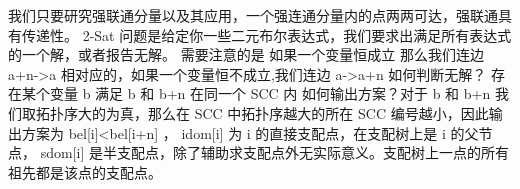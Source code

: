 {}\markdownRendererInterblockSeparator
{}
\markdownRendererSectionEnd 
\markdownRendererSectionEnd \markdownRendererSectionBegin
{}\markdownRendererInterblockSeparator
{}\markdownRendererSectionBegin
{}\markdownRendererInterblockSeparator
{}我们只要研究强联通分量以及其应用，一个强连通分量内的点两两可达，强联通具有传递性。\markdownRendererInterblockSeparator
{}\markdownRendererSectionBegin
{}\markdownRendererInterblockSeparator
{}\markdownRendererInterblockSeparator
{}
\markdownRendererSectionEnd \markdownRendererSectionBegin
{}\markdownRendererInterblockSeparator
{}\markdownRendererDollarSign{} 2-Sat \markdownRendererDollarSign{}问题是给定你一些二元布尔表达式，我们要求出满足所有表达式的一个解，或者报告无解。\markdownRendererParagraphSeparator
{}需要注意的是 如果一个变量恒成立 那么我们连边\markdownRendererDollarSign{} a+n->a \markdownRendererDollarSign{}\markdownRendererParagraphSeparator
{}相对应的，如果一个变量恒不成立,我们连边 \markdownRendererDollarSign{} a->a+n \markdownRendererDollarSign{}\markdownRendererParagraphSeparator
{}如何判断无解？ 存在某个变量\markdownRendererDollarSign{} b \markdownRendererDollarSign{}满足\markdownRendererDollarSign{} b \markdownRendererDollarSign{}和\markdownRendererDollarSign{} b+n \markdownRendererDollarSign{}在同一个\markdownRendererDollarSign{} SCC \markdownRendererDollarSign{}内\markdownRendererParagraphSeparator
{}如何输出方案？对于\markdownRendererDollarSign{} b \markdownRendererDollarSign{}和\markdownRendererDollarSign{} b+n \markdownRendererDollarSign{}我们取拓扑序大的为真，那么在\markdownRendererDollarSign{} SCC \markdownRendererDollarSign{}中拓扑序越大的所在\markdownRendererDollarSign{} SCC \markdownRendererDollarSign{}编号越小，因此输出方案为\markdownRendererDollarSign{} bel[i]<bel[i+n] \markdownRendererDollarSign{}，\markdownRendererInterblockSeparator
{}
\markdownRendererSectionEnd \markdownRendererSectionBegin
{}\markdownRendererInterblockSeparator
{}\markdownRendererDollarSign{} idom[i] \markdownRendererDollarSign{}为\markdownRendererDollarSign{} i \markdownRendererDollarSign{}的直接支配点，在支配树上是\markdownRendererDollarSign{} i \markdownRendererDollarSign{}的父节点，\markdownRendererDollarSign{} sdom[i] \markdownRendererDollarSign{}是半支配点，除了辅助求支配点外无实际意义。支配树上一点的所有祖先都是该点的支配点。\markdownRendererInterblockSeparator
